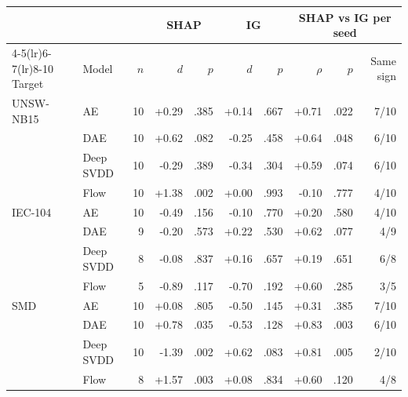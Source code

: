\begin{tabular}{llrrrrrrrr}\toprule
 & & & \multicolumn{2}{c}{SHAP} & \multicolumn{2}{c}{IG} & \multicolumn{3}{c}{SHAP vs IG per seed}\\
\cmidrule(lr){4-5}\cmidrule(lr){6-7}\cmidrule(lr){8-10}
Target & Model & $n$ & $d$ & $p$ & $d$ & $p$ & $\rho$ & $p$ & Same sign\\\midrule
UNSW-NB15 & AE & 10 & +0.29 & .385 & +0.14 & .667 & +0.71 & .022 & 7/10\\
 & DAE & 10 & +0.62 & .082 & -0.25 & .458 & +0.64 & .048 & 6/10\\
 & Deep SVDD & 10 & -0.29 & .389 & -0.34 & .304 & +0.59 & .074 & 6/10\\
 & Flow & 10 & +1.38 & .002 & +0.00 & .993 & -0.10 & .777 & 4/10\\
\midrule
IEC-104 & AE & 10 & -0.49 & .156 & -0.10 & .770 & +0.20 & .580 & 4/10\\
 & DAE & 9 & -0.20 & .573 & +0.22 & .530 & +0.62 & .077 & 4/9\\
 & Deep SVDD & 8 & -0.08 & .837 & +0.16 & .657 & +0.19 & .651 & 6/8\\
 & Flow & 5 & -0.89 & .117 & -0.70 & .192 & +0.60 & .285 & 3/5\\
\midrule
SMD & AE & 10 & +0.08 & .805 & -0.50 & .145 & +0.31 & .385 & 7/10\\
 & DAE & 10 & +0.78 & .035 & -0.53 & .128 & +0.83 & .003 & 6/10\\
 & Deep SVDD & 10 & -1.39 & .002 & +0.62 & .083 & +0.81 & .005 & 2/10\\
 & Flow & 8 & +1.57 & .003 & +0.08 & .834 & +0.60 & .120 & 4/8\\
\bottomrule\end{tabular}